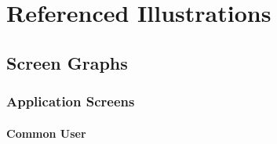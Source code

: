 \chapter{Referenced Illustrations}
\label{chap:appendix}


\section{Screen Graphs}
\label{sec:ScreenGraph}
\subsection{Application Screens}

\subsubsection{Common User}
